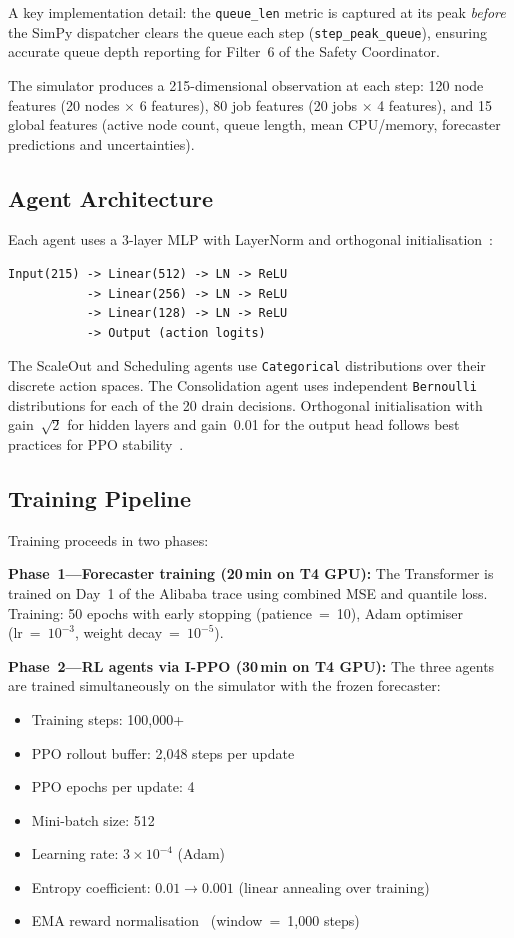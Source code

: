 \documentclass[conference]{IEEEtran}
\begin{document}
A key implementation detail: the \texttt{queue\_len} metric is captured at
its peak \emph{before} the SimPy dispatcher clears the queue each step
(\texttt{step\_peak\_queue}), ensuring accurate queue depth reporting for
Filter~6 of the Safety Coordinator.

The simulator produces a 215-dimensional observation at each step:
120 node features (20 nodes $\times$ 6 features), 80 job features
(20 jobs $\times$ 4 features), and 15 global features (active node count,
queue length, mean CPU/memory, forecaster predictions and uncertainties).

\subsection{Agent Architecture}

Each agent uses a 3-layer MLP with LayerNorm and orthogonal
initialisation~\cite{hu2020orthogonal}:

\begin{lstlisting}
Input(215) -> Linear(512) -> LN -> ReLU
           -> Linear(256) -> LN -> ReLU
           -> Linear(128) -> LN -> ReLU
           -> Output (action logits)
\end{lstlisting}

The ScaleOut and Scheduling agents use \texttt{Categorical} distributions
over their discrete action spaces.  The Consolidation agent uses independent
\texttt{Bernoulli} distributions for each of the 20 drain decisions.
Orthogonal initialisation with gain~$\sqrt{2}$ for hidden layers and
gain~0.01 for the output head follows best practices for PPO
stability~\cite{andrychowicz2021what}.

\subsection{Training Pipeline}

Training proceeds in two phases:

\textbf{Phase~1---Forecaster training (20\,min on T4 GPU):} The Transformer is
trained on Day~1 of the Alibaba trace using combined MSE and quantile loss.
Training: 50 epochs with early stopping (patience~=~10),
Adam optimiser~\cite{kingma2014adam} (lr~=~$10^{-3}$, weight decay~=~$10^{-5}$).

\textbf{Phase~2---RL agents via I-PPO (30\,min on T4 GPU):} The three agents
are trained simultaneously on the simulator with the frozen forecaster:
\begin{itemize}[leftmargin=*]
  \item Training steps: 100,000+
  \item PPO rollout buffer: 2,048 steps per update
  \item PPO epochs per update: 4
  \item Mini-batch size: 512
  \item Learning rate: $3 \times 10^{-4}$ (Adam)
  \item Entropy coefficient: $0.01 \rightarrow 0.001$ (linear annealing over training)
  \item EMA reward normalisation~\cite{welford1962note} (window~=~1,000 steps)
\end{itemize}
\end{document}
